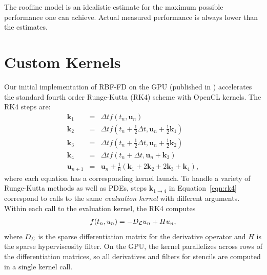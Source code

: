 \documentclass{report}
\begin{document}
The roofline model is an idealistic estimate for the maximum possible performance one can achieve. Actual measured performance is always lower than the estimates. 




\section{Custom Kernels}
\label{sec:custom_gpu_kernels}
 
Our initial implementation of RBF-FD on the GPU (published in \cite{BolligFlyerErlebacher2012}) accelerates the standard fourth order Runge-Kutta (RK4) scheme with OpenCL kernels. 
The RK4 steps are: 
\begin{eqnarray} 
\mathbf{k}_1 &=& \Delta t f(t_n, \mathbf{u}_n) \nonumber \\
\mathbf{k}_2 &=& \Delta t f(t_n+\frac{1}{2}\Delta t, \mathbf{u}_n + \frac{1}{2}\mathbf{k}_1) \nonumber \\
\mathbf{k}_3 &=& \Delta t f(t_n+\frac{1}{2}\Delta t, \mathbf{u}_n + \frac{1}{2}\mathbf{k}_2)  \label{eqn:rk4}\\
\mathbf{k}_4 &=& \Delta t f(t_n+\Delta t, \mathbf{u}_n + \mathbf{k}_3) \nonumber \\
\mathbf{u}_{n+1} &=& \mathbf{u}_{n} + \frac{1}{6}(\mathbf{k}_1 + 2\mathbf{k}_2 + 2\mathbf{k}_3 +\mathbf{k}_4), \nonumber
\end{eqnarray}
where each equation has a corresponding kernel launch. 
To handle a variety of Runge-Kutta methods as well as PDEs, steps $\mathbf{k}_{1\rightarrow4}$ in Equation~\ref{eqn:rk4} correspond to calls to the same \emph{evaluation kernel} with different arguments. Within each call to the evaluation kernel, the RK4 computes
\begin{align*}
f(t_n, u_n) = - D_{\mathcal{L}} u_n + H u_n, 
\end{align*}
where $D_{\mathcal{L}}$ is the sparse differentiation matrix for the derivative operator and $H$ is the sparse hyperviscosity filter. On the GPU, the kernel parallelizes across rows of the differentiation matrices, so all derivatives and filters for stencils are computed in a single kernel call.

\end{document}

